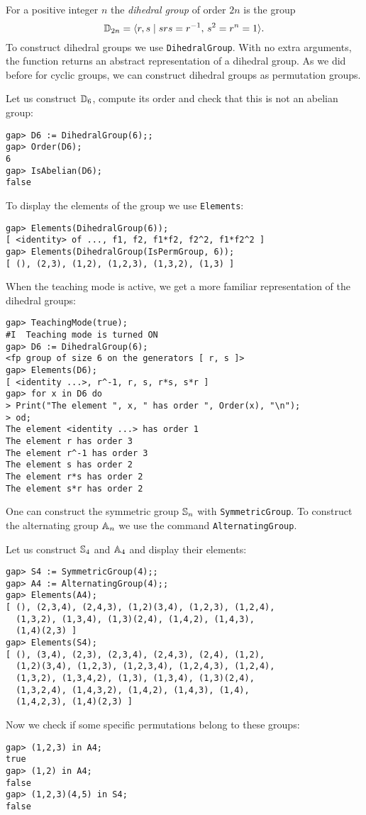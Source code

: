 For a positive integer $n$ the 
\emph{dihedral group} of order $2n$ is the group 
\[
\mathbb{D}_{2n}=\langle r,s \mid srs=r^{-1},\,s^2=r^n=1\rangle.
\]
To construct dihedral groups we use \lstinline{DihedralGroup}. With no extra
arguments, the function returns an abstract representation of a dihedral group. As we did before for cyclic groups, we can construct dihedral groups as
permutation groups. 

\begin{example}
Let us construct $\mathbb{D}_6$, compute its order 
and check that this is not an abelian group:
\begin{lstlisting}
gap> D6 := DihedralGroup(6);;
gap> Order(D6);
6
gap> IsAbelian(D6);
false
\end{lstlisting}
To display the elements of the group we use 
\lstinline{Elements}: 
\begin{lstlisting}
gap> Elements(DihedralGroup(6));
[ <identity> of ..., f1, f2, f1*f2, f2^2, f1*f2^2 ]
gap> Elements(DihedralGroup(IsPermGroup, 6));
[ (), (2,3), (1,2), (1,2,3), (1,3,2), (1,3) ]
\end{lstlisting}
When the teaching mode is active, 
we get a more familiar representation of the dihedral groups:
\begin{lstlisting}
gap> TeachingMode(true);
#I  Teaching mode is turned ON
gap> D6 := DihedralGroup(6);
<fp group of size 6 on the generators [ r, s ]>
gap> Elements(D6);
[ <identity ...>, r^-1, r, s, r*s, s*r ]
gap> for x in D6 do
> Print("The element ", x, " has order ", Order(x), "\n");
> od;
The element <identity ...> has order 1
The element r has order 3
The element r^-1 has order 3
The element s has order 2
The element r*s has order 2
The element s*r has order 2
\end{lstlisting}
\end{example}

One can construct the symmetric group $\mathbb{S}_n$ with \lstinline{SymmetricGroup}.
To construct the alternating group $\mathbb{A}_n$ we use the command
\lstinline{AlternatingGroup}. 

\begin{example}
Let us construct $\mathbb{S}_4$ and $\mathbb{A}_4$ and display their elements:
\begin{lstlisting}
gap> S4 := SymmetricGroup(4);;
gap> A4 := AlternatingGroup(4);;
gap> Elements(A4);
[ (), (2,3,4), (2,4,3), (1,2)(3,4), (1,2,3), (1,2,4), 
  (1,3,2), (1,3,4), (1,3)(2,4), (1,4,2), (1,4,3), 
  (1,4)(2,3) ]
gap> Elements(S4);
[ (), (3,4), (2,3), (2,3,4), (2,4,3), (2,4), (1,2), 
  (1,2)(3,4), (1,2,3), (1,2,3,4), (1,2,4,3), (1,2,4), 
  (1,3,2), (1,3,4,2), (1,3), (1,3,4), (1,3)(2,4), 
  (1,3,2,4), (1,4,3,2), (1,4,2), (1,4,3), (1,4), 
  (1,4,2,3), (1,4)(2,3) ]
\end{lstlisting}
Now we check if some specific permutations belong to these groups:
\begin{lstlisting}
gap> (1,2,3) in A4;
true
gap> (1,2) in A4;
false
gap> (1,2,3)(4,5) in S4;
false
\end{lstlisting}
\end{example}

